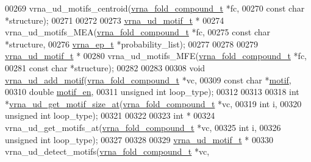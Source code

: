 \begin{DoxyCode}
00269 vrna\_ud\_motifs\_centroid(\hyperlink{group__fold__compound_structvrna__fc__s}{vrna\_fold\_compound\_t}  *fc,
00270                         \textcolor{keyword}{const} \textcolor{keywordtype}{char}            *structure);
00271 
00272 
00273 \hyperlink{structvrna__unstructured__domain__motif__s}{vrna\_ud\_motif\_t} *
00274 vrna\_ud\_motifs\_MEA(\hyperlink{group__fold__compound_structvrna__fc__s}{vrna\_fold\_compound\_t} *fc,
00275                    \textcolor{keyword}{const} \textcolor{keywordtype}{char}           *structure,
00276                    \hyperlink{group__struct__utils_structvrna__elem__prob__s}{vrna\_ep\_t}            *probability\_list);
00277 
00278 
00279 \hyperlink{structvrna__unstructured__domain__motif__s}{vrna\_ud\_motif\_t} *
00280 vrna\_ud\_motifs\_MFE(\hyperlink{group__fold__compound_structvrna__fc__s}{vrna\_fold\_compound\_t} *fc,
00281                    \textcolor{keyword}{const} \textcolor{keywordtype}{char}           *structure);
00282 
00283 
00308 \textcolor{keywordtype}{void}  \hyperlink{group__domains__up_gaec0c3313fb2951946614f920d289829a}{vrna\_ud\_add\_motif}(\hyperlink{group__fold__compound_structvrna__fc__s}{vrna\_fold\_compound\_t}  *vc,
00309                         \textcolor{keyword}{const} \textcolor{keywordtype}{char}            *\hyperlink{group__domains__up_af285436bbdea4436ad2cedec65d48c75}{motif},
00310                         \textcolor{keywordtype}{double}                \hyperlink{group__domains__up_aae4f0a45419784fb7c244bce2781403d}{motif\_en},
00311                         \textcolor{keywordtype}{unsigned} \textcolor{keywordtype}{int}          loop\_type);
00312 
00313 
00318 \textcolor{keywordtype}{int} *\hyperlink{unstructured__domains_8h_aea51485feeafed1f93222ba7db9fc3b1}{vrna\_ud\_get\_motif\_size\_at}(\hyperlink{group__fold__compound_structvrna__fc__s}{vrna\_fold\_compound\_t} *vc,
00319                                \textcolor{keywordtype}{int}                  i,
00320                                \textcolor{keywordtype}{unsigned} \textcolor{keywordtype}{int}         loop\_type);
00321 
00322 
00323 \textcolor{keywordtype}{int} *
00324 vrna\_ud\_get\_motifs\_at(\hyperlink{group__fold__compound_structvrna__fc__s}{vrna\_fold\_compound\_t}  *vc,
00325                       \textcolor{keywordtype}{int}                   i,
00326                       \textcolor{keywordtype}{unsigned} \textcolor{keywordtype}{int}          loop\_type);
00327 
00328 
00329 \hyperlink{structvrna__unstructured__domain__motif__s}{vrna\_ud\_motif\_t} *
00330 vrna\_ud\_detect\_motifs(\hyperlink{group__fold__compound_structvrna__fc__s}{vrna\_fold\_compound\_t}  *vc,

\end{DoxyCode}
